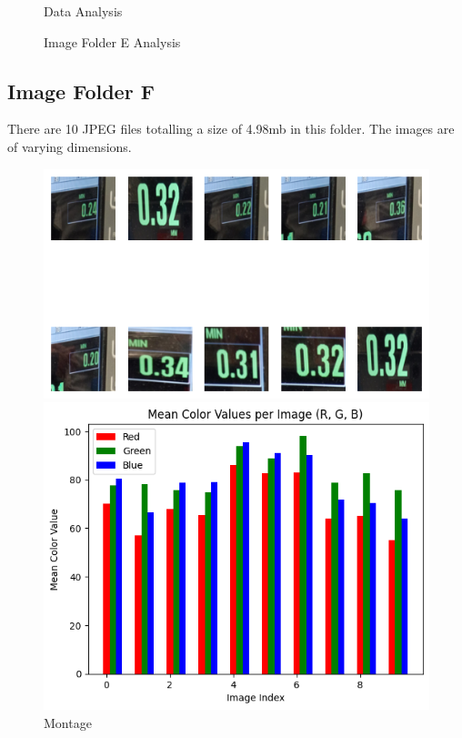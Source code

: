 \begin{figure}[ht]
\begin{minipage}[t]{0.50\textwidth}
        \caption*{Data Analysis}
    \end{minipage}
    \caption{Image Folder E Analysis}
    \label{fig:Image Folder E Analysis}
\end{figure}


\subsection{Image Folder F}

There are 10 JPEG files totalling a size of 4.98mb in this folder. The images are of varying dimensions.


\begin{figure}[ht]
    \centering
    \begin{minipage}[t]{0.25\textwidth}
        \centering
        \includegraphics[width=\textwidth]{Figures/EDA_Charts/7/montage.png}
        \caption*{Montage}
    \end{minipage}\hfill
    \begin{minipage}[t]{0.25\textwidth}
        \centering
        \includegraphics[width=\textwidth]{Figures/EDA_Charts/7/rgb.png}

\end{minipage}
\end{figure}
